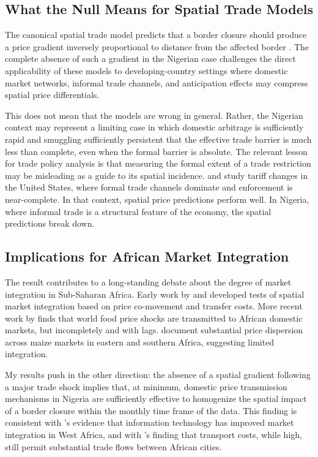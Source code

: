 \documentclass[12pt]{article}
\begin{document}
\subsection{What the Null Means for Spatial Trade Models}

The canonical spatial trade model predicts that a border closure should produce a price gradient inversely proportional to distance from the affected border \citep{krugman1991geography, allen2014trade}. The complete absence of such a gradient in the Nigerian case challenges the direct applicability of these models to developing-country settings where domestic market networks, informal trade channels, and anticipation effects may compress spatial price differentials.

This does not mean that the models are wrong in general. Rather, the Nigerian context may represent a limiting case in which domestic arbitrage is sufficiently rapid and smuggling sufficiently persistent that the effective trade barrier is much less than complete, even when the formal barrier is absolute. The relevant lesson for trade policy analysis is that measuring the formal extent of a trade restriction may be misleading as a guide to its spatial incidence. \citet{fajgelbaum2020return} and \citet{amiti2019impact} study tariff changes in the United States, where formal trade channels dominate and enforcement is near-complete. In that context, spatial price predictions perform well. In Nigeria, where informal trade is a structural feature of the economy, the spatial predictions break down.

\subsection{Implications for African Market Integration}

The result contributes to a long-standing debate about the degree of market integration in Sub-Saharan Africa. Early work by \citet{ravallion1986testing} and \citet{baulch1997transfer} developed tests of spatial market integration based on price co-movement and transfer costs. More recent work by \citet{minot2011transmission} finds that world food price shocks are transmitted to African domestic markets, but incompletely and with lags. \citet{jayne2006market} document substantial price dispersion across maize markets in eastern and southern Africa, suggesting limited integration.

My results push in the other direction: the absence of a spatial gradient following a major trade shock implies that, at minimum, domestic price transmission mechanisms in Nigeria are sufficiently effective to homogenize the spatial impact of a border closure within the monthly time frame of the data. This finding is consistent with \citet{aker2010information}'s evidence that information technology has improved market integration in West Africa, and with \citet{storeygard2016farther}'s finding that transport costs, while high, still permit substantial trade flows between African cities.
\end{document}
